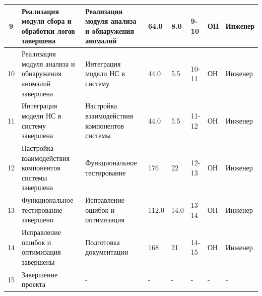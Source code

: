 {\begin{longtable}{|c|p{3cm}|p{3cm}|p{1.5cm}|p{1.5cm}|p{1.2cm}|p{1.2cm}|p{2.9cm}|}
9 & Реализация модуля сбора и обработки логов завершена & Реализация модуля анализа и обнаружения аномалий & 64.0  & 8.0 & 9-10 & ОН & Инженер \\ \hline

10 & Реализация модуля анализа и обнаружения аномалий завершена & Интеграция модели НС в систему & 44.0  & 5.5  & 10-11 & ОН & Инженер \\ \hline

11 & Интеграция модели НС в систему завершена & Настройка взаимодействия компонентов системы & 44.0  & 5.5  & 11-12 & ОН & Инженер \\ \hline

12 & Настройка взаимодействия компонентов системы завершена & Функциональное тестирование & 176  & 22  & 12-13 & ОН & Инженер \\ \hline

13 & Функциональное тестирование завершено & Исправление ошибок и оптимизация & 112.0 & 14.0  & 13-14 & ОН & Инженер \\ \hline

14 & Исправление ошибок и оптимизация завершены & Подготовка документации & 168  & 21 & 14-15 & ОН & Инженер \\ \hline

15 & Завершение проекта & - & -  & - & - & - & - \\ \hline

\end{longtable}
}